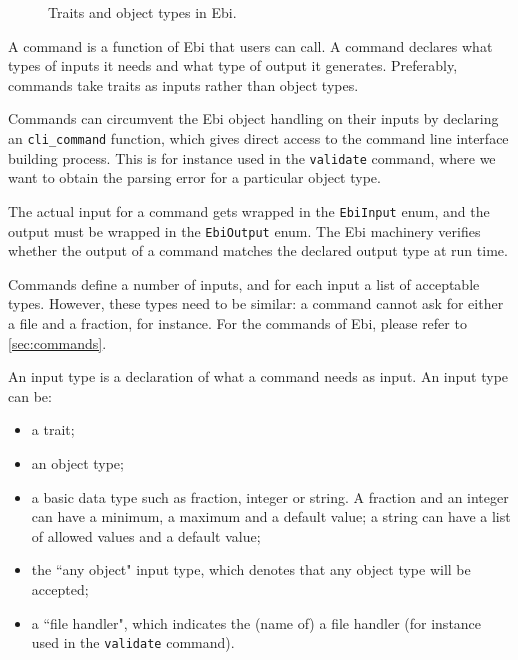 \documentclass{book}
\def\ebiCommand#1{\texttt{#1}}
\begin{document}
\begin{figure}[tb]
        \caption{Traits and object types in Ebi.}
        \label{fig:traits}
    \end{figure}
        

        A command is a function of Ebi that users can call.
        A command declares what types of inputs it needs and what type of output it generates. 
        Preferably, commands take traits as inputs rather than object types.

        Commands can circumvent the Ebi object handling on their inputs by declaring an \texttt{cli\_command} function, which gives direct access to the command line interface building process.
        This is for instance used in the \ebiCommand{validate} command, where we want to obtain the parsing error for a particular object type.

        The actual input for a command gets wrapped in the \texttt{EbiInput} enum, and the output must be wrapped in the \texttt{EbiOutput} enum.
        The Ebi machinery verifies whether the output of a command matches the declared output type at run time.
        
        Commands define a number of inputs, and for each input a list of acceptable types.
        However, these types need to be similar: a command cannot ask for either a file and a fraction, for instance.
        For the commands of Ebi, please refer to \cref{sec:commands}.
    
        An input type is a declaration of what a command needs as input.
        An input type can be:
        \begin{itemize}
            \item a trait;
            \item an object type;
            \item a basic data type such as fraction, integer or string. A fraction and an integer can have a minimum, a maximum and a default value; a string can have a list of allowed values and a default value;
            \item the ``any object" input type, which denotes that any object type will be accepted;
            \item a ``file handler", which indicates the (name of) a file handler (for instance used in the \ebiCommand{validate} command).
        \end{itemize}
\end{document}
